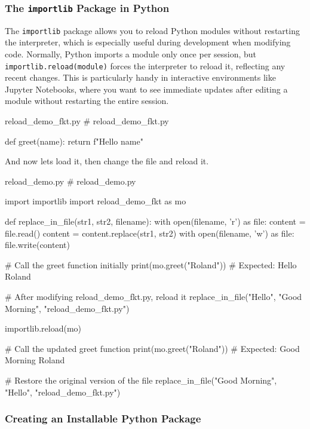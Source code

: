 \subsubsection{The \texttt{importlib} Package in Python}

The \texttt{importlib} package allows you to reload Python modules without restarting the interpreter, which is especially useful during development when modifying code. Normally, Python imports a module only once per session, but \texttt{importlib.reload(module)} forces the interpreter to reload it, reflecting any recent changes. This is particularly handy in interactive environments like Jupyter Notebooks, where you want to see immediate updates after editing a module without restarting the entire session.

\begin{codeonly}{reload\_demo\_fkt.py}
# reload_demo_fkt.py

def greet(name):
    return f"Hello {name}"
\end{codeonly}

And now lets load it, then change the file and reload it. 

\begin{codeonly}{reload\_demo.py}
# reload_demo.py

import importlib
import reload_demo_fkt as mo

def replace_in_file(str1, str2, filename):
    with open(filename, 'r') as file:
        content = file.read()
    content = content.replace(str1, str2)
    with open(filename, 'w') as file:
        file.write(content)

# Call the greet function initially
print(mo.greet("Roland"))  # Expected: Hello Roland

# After modifying reload_demo_fkt.py, reload it
replace_in_file("Hello", "Good Morning", "reload_demo_fkt.py")

importlib.reload(mo)

# Call the updated greet function
print(mo.greet("Roland"))  # Expected: Good Morning Roland

# Restore the original version of the file
replace_in_file("Good Morning", "Hello", "reload_demo_fkt.py")
\end{codeonly}

%
\subsubsection{Creating an Installable Python Package}


